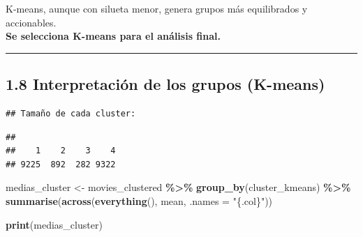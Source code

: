 \documentclass[
]{article}
\newenvironment{Shaded}{\begin{snugshade}}{\end{snugshade}}
\newcommand{\AttributeTok}[1]{\textcolor[rgb]{0.13,0.29,0.53}{#1}}
\newcommand{\FunctionTok}[1]{\textcolor[rgb]{0.13,0.29,0.53}{\textbf{#1}}}
\newcommand{\NormalTok}[1]{#1}
\newcommand{\OtherTok}[1]{\textcolor[rgb]{0.56,0.35,0.01}{#1}}
\newcommand{\SpecialCharTok}[1]{\textcolor[rgb]{0.81,0.36,0.00}{\textbf{#1}}}
\newcommand{\StringTok}[1]{\textcolor[rgb]{0.31,0.60,0.02}{#1}}
\begin{document}
K-means, aunque con silueta menor, genera grupos más equilibrados y
accionables.\\
\textbf{Se selecciona K-means para el análisis final.}

\begin{center}\rule{0.5\linewidth}{0.5pt}\end{center}

\subsection{1.8 Interpretación de los grupos
(K-means)}\label{interpretaciuxf3n-de-los-grupos-k-means}

\begin{Shaded}
\end{Shaded}

\begin{verbatim}
## Tamaño de cada cluster:
\end{verbatim}

\begin{Shaded}
\end{Shaded}

\begin{verbatim}
## 
##    1    2    3    4 
## 9225  892  282 9322
\end{verbatim}

\begin{Shaded}
\begin{Highlighting}[]
\NormalTok{medias\_cluster }\OtherTok{\textless{}{-}}\NormalTok{ movies\_clustered }\SpecialCharTok{\%\textgreater{}\%}
  \FunctionTok{group\_by}\NormalTok{(cluster\_kmeans) }\SpecialCharTok{\%\textgreater{}\%}
  \FunctionTok{summarise}\NormalTok{(}\FunctionTok{across}\NormalTok{(}\FunctionTok{everything}\NormalTok{(), mean, }\AttributeTok{.names =} \StringTok{"\{.col\}"}\NormalTok{))}

\FunctionTok{print}\NormalTok{(medias\_cluster)}
\end{Highlighting}
\end{Shaded}
\end{document}
